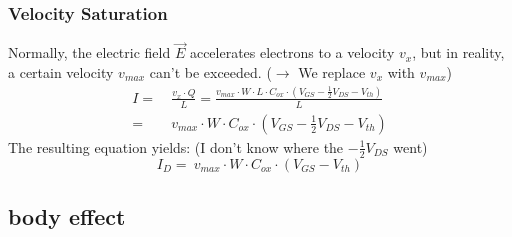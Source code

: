 \documentclass[11ypt]{extarticle}
\begin{document}
\subsubsection{Velocity Saturation}

Normally, the electric field $\vec{E}$ accelerates electrons to a velocity $v_x$, but in reality, a certain velocity $v_{max}$ can't be exceeded. ($\rightarrow$ We replace $v_x$ with $v_{max}$)
\begin{equation}
\begin{aligned}
    I =& \ \frac{v_x \cdot Q}{L} = \frac{v_{max} \cdot W \cdot L \cdot C_{ox} \cdot (V_{GS} - \frac{1}{2}V_{DS} - V_{th})}{L}
    \\
    =& \ v_{max} \cdot W \cdot C_{ox} \cdot (V_{GS} - \frac{1}{2}V_{DS} - V_{th})
\end{aligned}
\end{equation}
The resulting equation yields: (I don't know where the $- \frac{1}{2}V_{DS}$ went)
\begin{equation}
    I_D = \ v_{max} \cdot W \cdot C_{ox} \cdot (V_{GS}- V_{th})
\end{equation}

\subsection{body effect}

%
%
\end{document}
